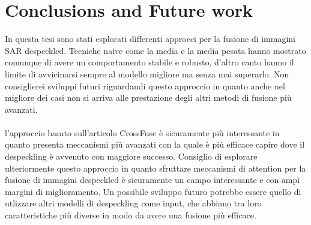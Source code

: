 
\chapter{Conclusions and Future work}
In questa tesi sono stati esplorati differenti approcci per la fusione di immagini SAR despeckled. 
Tecniche naive come la media e la media pesata hanno mostrato comunque di avere un comportamento stabile e robusto, 
d'altro canto hanno il limite di avvicinarsi sempre al modello migliore ma senza mai superarlo.
Non consiglierei sviluppi futuri riguardandi questo approccio in quanto anche nel migliore dei casi non 
si arriva alle prestazione degli altri metodi di fusione più avanzati.
\\\\
l'approccio basato sull'articolo CrossFuse è sicuramente più interessante in quanto 
presenta meccanismi più avanzati con la quale è più efficace capire dove il despeckling è avvenuto con maggiore successo.
Consiglio di esplorare ulteriormente questo approccio in quanto sfruttare meccanismi di attention
per la fusione di immagini despeckled è sicuramente un campo interessante e con ampi margini di miglioramento.
Un possibile sviluppo futuro potrebbe essere quello di utlizzare altri modelli di despeckling come input, che abbiano 
tra loro caratteristiche più diverse in modo da avere una fusione più efficace.
